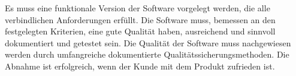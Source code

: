 Es muss eine funktionale Version der Software vorgelegt werden, die alle verbindlichen Anforderungen erfüllt.
 Die Software muss, bemessen an den festgelegten Kriterien, eine gute Qualität haben, ausreichend und sinnvoll dokumentiert und getestet sein.
 Die Qualität der Software muss nachgewiesen werden durch umfangreiche dokumentierte Qualitätssicherungsmethoden. Die Abnahme ist erfolgreich, wenn der Kunde mit dem Produkt zufrieden ist.
